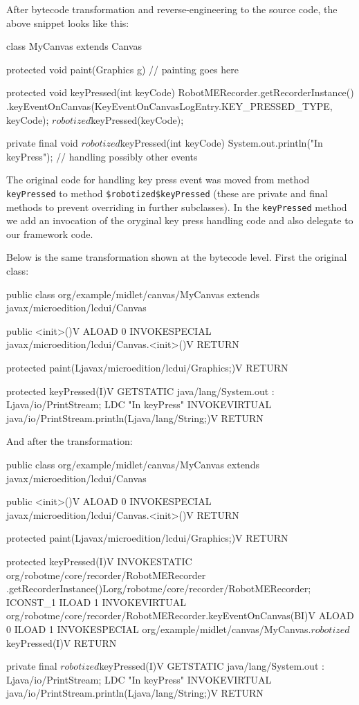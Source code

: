 \noindent%
After bytecode transformation and reverse-engineering to the source code, the
above snippet looks like this:

\begin{javablock}
class MyCanvas extends Canvas {

	protected void paint(Graphics g) {
        // painting goes here
	}

	protected void keyPressed(int keyCode) {
		RobotMERecorder.getRecorderInstance()
            .keyEventOnCanvas(KeyEventOnCanvasLogEntry.KEY_PRESSED_TYPE, keyCode);
		$robotized$keyPressed(keyCode);
	}

	private final void $robotized$keyPressed(int keyCode) {
		System.out.println("In keyPress");
	}
// handling possibly other events
}
\end{javablock}

The original code for handling key press event was moved from method \texttt{keyPressed} to
method \texttt{\$robotized\$keyPressed} (these are private and final
methods to prevent overriding in further subclasses). In the \texttt{keyPressed} method 
we add an invocation of the oryginal key press handling code and also delegate to our framework code.

Below is the same transformation shown at the bytecode level. First the original class:

\begin{javablock}
public class org/example/midlet/canvas/MyCanvas extends javax/microedition/lcdui/Canvas  {

  public <init>()V
    ALOAD 0
    INVOKESPECIAL javax/microedition/lcdui/Canvas.<init>()V
    RETURN

  protected paint(Ljavax/microedition/lcdui/Graphics;)V
    RETURN

  protected keyPressed(I)V
    GETSTATIC java/lang/System.out : Ljava/io/PrintStream;
    LDC "In keyPress"
    INVOKEVIRTUAL java/io/PrintStream.println(Ljava/lang/String;)V
    RETURN
}
\end{javablock}

\noindent%
And after the transformation:

\begin{javablock}
public class org/example/midlet/canvas/MyCanvas extends javax/microedition/lcdui/Canvas  {

  public <init>()V
    ALOAD 0
    INVOKESPECIAL javax/microedition/lcdui/Canvas.<init>()V
    RETURN

  protected paint(Ljavax/microedition/lcdui/Graphics;)V
    RETURN

  protected keyPressed(I)V
    INVOKESTATIC org/robotme/core/recorder/RobotMERecorder
        .getRecorderInstance()Lorg/robotme/core/recorder/RobotMERecorder;
    ICONST_1
    ILOAD 1
    INVOKEVIRTUAL org/robotme/core/recorder/RobotMERecorder.keyEventOnCanvas(BI)V
    ALOAD 0
    ILOAD 1
    INVOKESPECIAL org/example/midlet/canvas/MyCanvas.$robotized$keyPressed(I)V
    RETURN

  private final $robotized$keyPressed(I)V
    GETSTATIC java/lang/System.out : Ljava/io/PrintStream;
    LDC "In keyPress"
    INVOKEVIRTUAL java/io/PrintStream.println(Ljava/lang/String;)V
    RETURN
}
\end{javablock}


